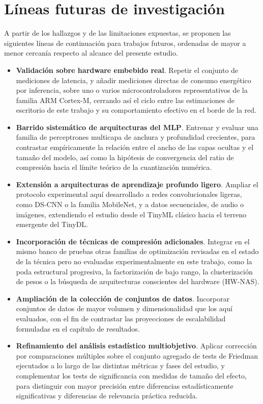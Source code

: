 \documentclass[a4paper,12pt,twoside,final]{book}
\begin{document}
\section{Líneas futuras de investigación}
A partir de los hallazgos y de las limitaciones expuestas, se proponen las siguientes líneas de continuación para
trabajos futuros, ordenadas de mayor a menor cercanía respecto al alcance del presente estudio.
 
\begin{itemize}
  \item \textbf{Validación sobre hardware embebido real}. Repetir el conjunto de mediciones de latencia, y añadir
  mediciones directas de consumo energético por inferencia, sobre uno o varios microcontroladores representativos de
  la familia ARM Cortex-M, cerrando así el ciclo entre las estimaciones de escritorio de este trabajo y su
  comportamiento efectivo en el borde de la red.
  \item \textbf{Barrido sistemático de arquitecturas del MLP}. Entrenar y evaluar una familia de perceptrones
  multicapa de anchura y profundidad crecientes, para contrastar empíricamente la relación entre el ancho de las capas
  ocultas y el tamaño del modelo, así como la hipótesis de convergencia del ratio de compresión hacia el límite teórico
  de la cuantización numérica.
  \item \textbf{Extensión a arquitecturas de aprendizaje profundo ligero}. Ampliar el protocolo experimental aquí
  desarrollado a redes convolucionales ligeras, como DS-CNN o la familia MobileNet, y a datos secuenciales, de audio o
  imágenes, extendiendo el estudio desde el TinyML clásico hacia el terreno emergente del TinyDL.
  \item \textbf{Incorporación de técnicas de compresión adicionales}. Integrar en el mismo banco de pruebas otras
  familias de optimización revisadas en el estado de la técnica pero no evaluadas experimentalmente en este trabajo,
  como la poda estructural progresiva, la factorización de bajo rango, la clusterización de pesos o la búsqueda de
  arquitecturas conscientes del hardware (HW-NAS).
  \item \textbf{Ampliación de la colección de conjuntos de datos}. Incorporar conjuntos de datos de mayor volumen y
  dimensionalidad que los aquí evaluados, con el fin de contrastar las proyecciones de escalabilidad formuladas en el
  capítulo de resultados.
  \item \textbf{Refinamiento del análisis estadístico multiobjetivo}. Aplicar corrección por comparaciones múltiples
  sobre el conjunto agregado de tests de Friedman ejecutados a lo largo de las distintas métricas y fases del
  estudio, y complementar los tests de significancia con medidas de tamaño del efecto, para distinguir con mayor
  precisión entre diferencias estadísticamente significativas y diferencias de relevancia práctica reducida.
\end{itemize}
 
\end{document}
